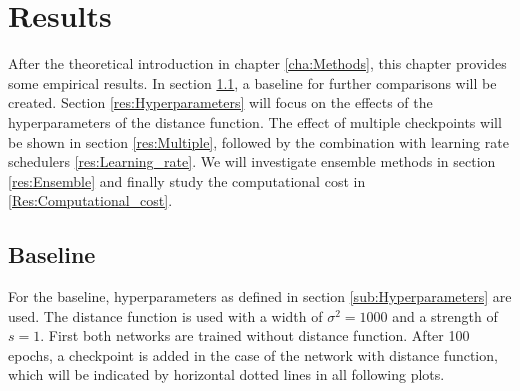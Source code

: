 \chapter{Results}

After the theoretical introduction in chapter \ref{cha:Methods}, this chapter
provides some empirical results. In section \ref{res:Baseline}, a baseline for
further comparisons will be created. Section \ref{res:Hyperparameters} will
focus on the effects of the hyperparameters of the distance function. The effect
of multiple checkpoints will be shown in section \ref{res:Multiple}, followed by
the combination with learning rate schedulers \ref{res:Learning_rate}. We will
investigate ensemble methods in section \ref{res:Ensemble} and
finally study the computational cost in \ref{Res:Computational_cost}.
\pagebreak


\section{Baseline}\label{res:Baseline}

For the baseline, hyperparameters as defined in section
\ref{sub:Hyperparameters} are used. The distance function is used with a width
of $\sigma^2=1000$ and a strength of $s=1$. First both networks are trained
without distance function. After 100 epochs, a checkpoint is added in the case
of the network with distance function, which will be indicated by horizontal
dotted lines in all following plots.

